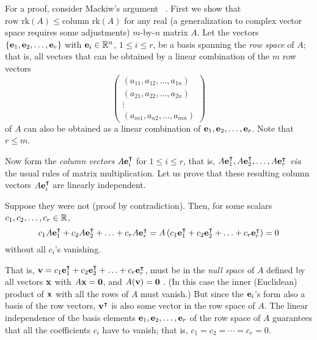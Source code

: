 {\color{OliveGreen}
\bproof

For a proof, consider   Mackiw's   argument ~\cite{Mackiw-1995}.
First we show that $\textrm{row rk} (A)\le \textrm{column rk} (A)$ for any real
(a generalization to complex vector space requires some adjustments)
$m$-by-$n$ matrix $A$. Let the vectors
$\{{\bf e}_1,{\bf e}_2, \ldots ,{\bf e}_r\}$ with ${\bf e}_i \in {\Bbb R}^n$, $1\le i\le r$,
be a basis spanning the
{\em row space} of
 $A$; that is, all vectors
that can be obtained by a linear combination of the $m$ row vectors
$$
\begin{pmatrix}
(a_{11},a_{12},\ldots ,a_{1n})\\
(a_{21},a_{22},\ldots ,a_{2n})\\
\vdots                    \\
(a_{m1},a_{n2},\ldots ,a_{mn})
\end{pmatrix}
$$
of $A$ can also be obtained as a linear combination of ${\bf e}_1,{\bf e}_2, \ldots ,{\bf e}_r$.
Note that $r\le m$.

Now form the {\em column vectors} $A{\bf e}_i^\intercal $ for $1\le i\le r$, that is,
$A{\bf e}_1^\intercal ,A{\bf e}_2^\intercal , \ldots ,A{\bf e}_r^\intercal $ {\em via} the usual rules of matrix multiplication.
Let us prove that these resulting column vectors $A{\bf e}_i^\intercal $ are linearly independent.

Suppose they were not (proof by contradiction).
Then, for some scalars
$c_1,c_2, \ldots ,c_r \in {\Bbb R}$,
$$
c_1 A{\bf e}_1^\intercal + c_2 A{\bf e}_2^\intercal + \ldots + c_r A{\bf e}_r^\intercal
=
 A\left(c_1{\bf e}_1^\intercal + c_2  {\bf e}_2^\intercal + \ldots + c_r  {\bf e}_r^\intercal  \right)=0
$$
without all $c_i$'s vanishing.

That is,
$
{\bf v} =
c_1{\bf e}_1^\intercal + c_2  {\bf e}_2^\intercal + \ldots + c_r  {\bf e}_r^\intercal
$, must be in the {\em null space}
of $A$ defined by all vectors ${\bf x}$ with $A{\bf x}={\bf 0}$,
and $A({\bf v})={\bf 0}$ .
(In this case the inner (Euclidean) product of ${\bf x}$ with all the rows of $A$ must vanish.)
But since the ${\bf e}_i$'s form also a basis of the row vectors,
$
{\bf v}^\intercal
$
is also some vector in the row space of $A$.
The linear independence of the basis elements
${\bf e}_1,{\bf e}_2, \ldots ,{\bf e}_r$   of the row  space of $A$
guarantees that
all the coefficients $c_i$ have to vanish; that is,
$c_1=c_2= \cdots =c_r =0$.

}
